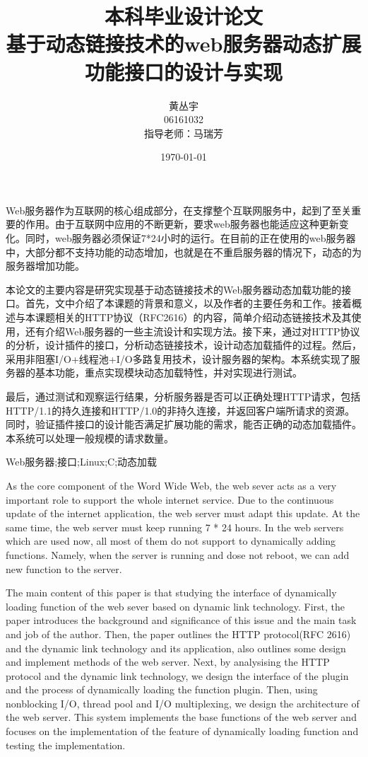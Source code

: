 \documentclass[twoside, xetex]{report}
\begin{document}
\title{{\Huge 本科毕业设计论文\\}基于动态链接技术的web服务器动态扩展功能接口的设计与实现}
\author{黄丛宇\\06161032\\指导老师：马瑞芳}
\date{\today}

\lfour

\zhabstract 

Web服务器作为互联网的核心组成部分，在支撑整个互联网服务中，起到了至关重要的作用。由于互联网中应用的不断更新，要求web服务器也能适应这种更新变化。同时，web服务器必须保证7*24小时的运行。在目前的正在使用的web服务器中，大部分都不支持功能的动态增加，也就是在不重启服务器的情况下，动态的为服务器增加功能。

本论文的主要内容是研究实现基于动态链接技术的Web服务器动态加载功能的接口。首先，文中介绍了本课题的背景和意义，以及作者的主要任务和工作。接着概述与本课题相关的HTTP协议（RFC2616）的内容，简单介绍动态链接技术及其使用，还有介绍Web服务器的一些主流设计和实现方法。接下来，通过对HTTP协议的分析，设计插件的接口，分析动态链接技术，设计动态加载插件的过程。然后，采用非阻塞I/O+线程池+I/O多路复用技术，设计服务器的架构。本系统实现了服务器的基本功能，重点实现模块动态加载特性，并对实现进行测试。

最后，通过测试和观察运行结果，分析服务器是否可以正确处理HTTP请求，包括HTTP/1.1的持久连接和HTTP/1.0的非持久连接，并返回客户端所请求的资源。同时，验证插件接口的设计能否满足扩展功能的需求，能否正确的动态加载插件。本系统可以处理一般规模的请求数量。

{\zhkeywords Web服务器;接口;Linux;C;动态加载}

\enabstract
	As the core component of the Word Wide Web, the web sever acts as a very important role to support the whole internet service. Due to the continuous update of the internet application, the web server must adapt this update. At the same time, the web server must keep running 7 * 24 hours. In the web servers which are used now, all most of them do not support to dynamically adding functions. Namely, when the server is running and dose not reboot, we can add new function to the server. 
	
	The main content of this paper is that studying the interface of dynamically loading function of the web sever based on dynamic link technology. First, the paper introduces the background and significance of this issue and the main task and job of the author. Then, the paper outlines the HTTP protocol(RFC 2616) and the dynamic link technology and its application, also outlines some design and implement methods of the web server. Next, by analysising the HTTP protocol and the dynamic link technology, we design the interface of the plugin and the process of dynamically loading the function plugin. Then, using nonblocking I/O, thread pool and I/O multiplexing, we design the architecture of the web server. This system implements the base functions of the web server and focuses on the implementation of the feature of dynamically loading function and testing the implementation.
	
\end{document}
